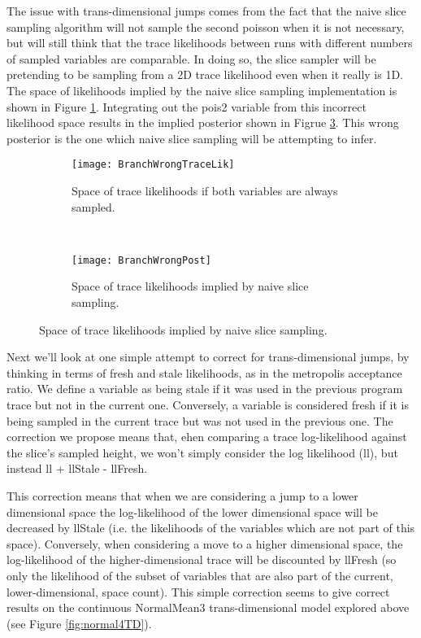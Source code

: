 The issue with trans-dimensional jumps comes from the fact that the naive slice sampling algorithm will not sample the second poisson when it is not necessary, but will still think that the trace likelihoods between runs with different numbers of sampled variables are comparable. In doing so, the slice sampler will be pretending to be sampling from a 2D trace likelihood even when it really is 1D. The space of likelihoods implied by the naive slice sampling implementation is shown in Figure \ref{fig:branchWrongTraceLik}. Integrating out the pois2 variable from this incorrect likelihood space results in the implied posterior shown in Figrue \ref{fig:branchWrongPost}. This wrong posterior is the one which naive slice sampling will be attempting to infer. 

\begin{figure}[h]
        \centering
        \begin{subfigure}[b]{0.48\textwidth}
                \centering
                \texttt{[image: BranchWrongTraceLik]}
                \caption{Space of trace likelihoods if both variables are always sampled.}
                \label{fig:branchWrongTraceLik}
        \end{subfigure}
        ~ 
        \begin{subfigure}[b]{0.48\textwidth}
                \centering
                \texttt{[image: BranchWrongPost]}
                \caption{Space of trace likelihoods implied by naive slice sampling.}
                \label{fig:branchWrongPost}
        \end{subfigure}
\end{figure}

Next we'll look at one simple attempt to correct for trans-dimensional jumps, by thinking in terms of fresh and stale likelihoods, as in the metropolis acceptance ratio. We define a variable as being stale if it was used in the previous program trace but not in the current one. Conversely, a variable is considered fresh if it is being sampled in the current trace but was not used in the previous one. The correction we propose means that, ehen comparing a trace log-likelihood against the slice's sampled height, we won't simply consider the log likelihood (ll), but instead ll + llStale - llFresh.

This correction means that when we are considering a jump to a lower dimensional space the log-likelihood of the lower dimensional space will be decreased by llStale (i.e. the likelihoods of the variables which are not part of this space). Conversely, when considering a move to a higher dimensional space, the log-likelihood of the higher-dimensional trace will be discounted by llFresh (so only the likelihood of the subset of variables that are also part of the current, lower-dimensional, space count). This simple correction seems to give correct results on the continuous NormalMean3 trans-dimensional model explored above (see Figure \ref{fig:normal4TD}).

